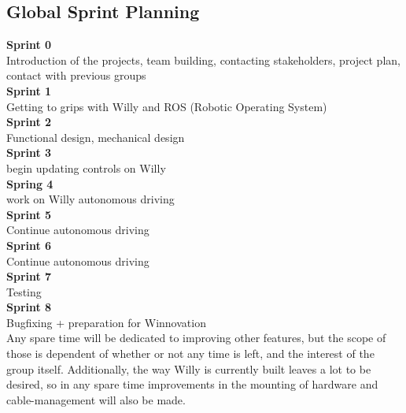 \subsection{Global Sprint Planning}
\noindent \textbf{Sprint 0}\\
Introduction of the projects, team building, contacting stakeholders, project plan, contact with previous groups\\
\textbf{Sprint 1}\\
Getting to grips with Willy and ROS (Robotic Operating System)\\
\textbf{Sprint 2}\\
Functional design, mechanical design\\
\textbf{Sprint 3}\\
begin updating controls on Willy\\
\textbf{Spring 4}\\
work on Willy autonomous driving\\
\textbf{Sprint 5}\\
Continue autonomous driving\\
\textbf{Sprint 6} \\
Continue autonomous driving\\
\textbf{Sprint 7}\\
Testing\\
\textbf{Sprint 8}\\
Bugfixing + preparation for Winnovation \\

Any spare time will be dedicated to improving other features, but the scope of those is dependent of whether or not any time is left, and the interest of the group itself.
Additionally, the way Willy is currently built leaves a lot to be desired, so in any spare time improvements in the mounting of hardware and cable-management will also be made.

\newpage
